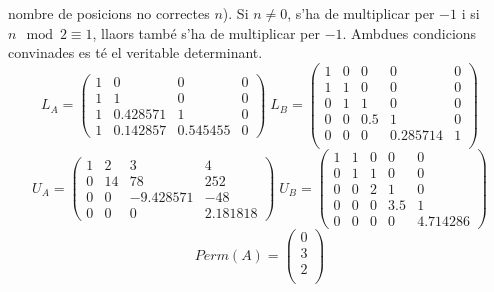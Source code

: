 \documentclass[a4paper, 12pt]{article}
\begin{document}
\begin{exercici}
\begin{enumerate}[label=\alph*)]
\begin{solucio}
                nombre de posicions no correctes $n$). Si $n\neq0$, s'ha de multiplicar per $-1$ i si $n \mod 2 \equiv 1$,
                llaors també s'ha de multiplicar per $-1$. Ambdues condicions convinades es té el 
                veritable determinant.
                $$
                L_A = 
                \begin{pmatrix}
                    1 & 0 & 0 & 0\\
                    1 & 1 & 0 & 0\\
                    1 & 0.428571 & 1 & 0\\
                    1 & 0.142857 & 0.545455 & 0
                \end{pmatrix}\;
                L_B = 
                \begin{pmatrix}
                    1 & 0 & 0 & 0 & 0\\
                    1 & 1 & 0 & 0 & 0\\
                    0 & 1 & 1 & 0 & 0\\
                    0 & 0 & 0.5 & 1 & 0\\
                    0 & 0 & 0 & 0.285714 & 1\\
                \end{pmatrix}
                $$
                $$
                U_A = 
                \begin{pmatrix}
                    1 & 2 & 3 & 4\\
                    0 & 14 & 78 & 252\\
                    0 & 0 & -9.428571 & -48\\
                    0 & 0 & 0 & 2.181818
                \end{pmatrix}\;
                U_B = 
                \begin{pmatrix}
                    1 & 1 & 0 & 0 & 0\\
                    0 & 1 & 1 & 0 & 0\\
                    0 & 0 & 2 & 1 & 0\\
                    0 & 0 & 0 & 3.5 & 1\\
                    0 & 0 & 0 & 0 & 4.714286
                \end{pmatrix}
                $$
                $$
                Perm(A) =
                \begin{pmatrix}
                    0\\
                    3\\
                    2\\

\end{pmatrix}$$
\end{solucio}
\end{enumerate}
\end{exercici}
\end{document}

